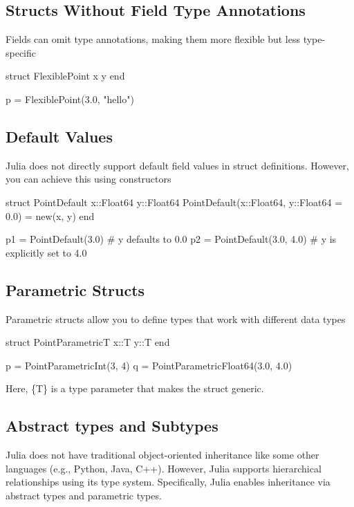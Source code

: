 \documentclass{report}
\begin{document}
     \bigbreak \noindent 
     \subsection{Structs Without Field Type Annotations}
     \bigbreak \noindent 
     Fields can omit type annotations, making them more flexible but less type-specific
     \bigbreak \noindent 
     \begin{jlcode}
     struct FlexiblePoint
         x
         y
     end

     p = FlexiblePoint(3.0, "hello")
     \end{jlcode}

     \bigbreak \noindent 
     \subsection{Default Values}
     \bigbreak \noindent 
     Julia does not directly support default field values in struct definitions. However, you can achieve this using constructors
     \bigbreak \noindent 
     \begin{jlcode}
         struct PointDefault
             x::Float64
             y::Float64
             PointDefault(x::Float64, y::Float64 = 0.0) = new(x, y)
         end

         p1 = PointDefault(3.0)  # y defaults to 0.0
         p2 = PointDefault(3.0, 4.0)  # y is explicitly set to 4.0
     \end{jlcode}

     \bigbreak \noindent 
     \subsection{Parametric Structs}
     \bigbreak \noindent 
     Parametric structs allow you to define types that work with different data types
     \bigbreak \noindent 
     \begin{jlcode}
         struct PointParametric{T}
             x::T
             y::T
         end

         p = PointParametric{Int}(3, 4)
         q = PointParametric{Float64}(3.0, 4.0)
     \end{jlcode}
     \bigbreak \noindent 
     Here, \{T\} is a type parameter that makes the struct generic.

     \bigbreak \noindent 
     \subsection{Abstract types and Subtypes}
     \bigbreak \noindent 
     Julia does not have traditional object-oriented inheritance like some other languages (e.g., Python, Java, C++). However, Julia supports hierarchical relationships using its type system. Specifically, Julia enables inheritance via abstract types and parametric types.
     \bigbreak \noindent 
\end{document}
